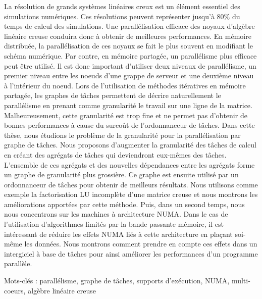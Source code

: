 La résolution de grands systèmes linéaires creux est un élément essentiel des simulations numériques. Ces résolutions peuvent représenter jusqu'à 80\% du temps de calcul des simulations.
Une parallélisation efficace des noyaux d'algèbre linéaire creuse conduira donc à obtenir de meilleures performances. En mémoire distribuée, la parallélisation de ces noyaux se fait le plus souvent en modifiant le schéma numérique. Par contre, en mémoire partagée, un parallélisme plus efficace peut être utilisé. Il est donc important d'utiliser deux niveaux de parallélisme, un premier niveau entre les noeuds d'une grappe de serveur et une deuxième niveau à l'intérieur du noeud. Lors de l'utilisation de méthodes itératives en mémoire partagée, les graphes de tâches permettent de décrire naturellement le parallélisme en prenant comme granularité le travail sur une ligne de la matrice. Malheureusement, cette granularité est trop fine et ne permet pas d'obtenir de bonnes performances à cause du surcoût de l'ordonnanceur de tâches.
Dans cette thèse, nous étudions le problème de la granularité pour la parallélisation par graphe de tâches. Nous proposons d'augmenter la granularité des tâches de calcul en créant des agrégats de tâches qui deviendront eux-mêmes des tâches. L'ensemble de ces agrégats et des nouvelles dépendances entre les agrégats forme un graphe de granularité plus grossière. Ce graphe est ensuite utilisé par un ordonnanceur de tâches pour obtenir de meilleurs résultats. Nous utilisons comme exemple la factorisation LU incomplète d'une matrice creuse et nous montrons les améliorations apportées par cette méthode. Puis, dans un second temps, nous nous concentrons sur les machines à architecture NUMA. Dans le cas de l'utilisation d'algorithmes limités par la bande passante mémoire, il est intéressant de réduire les effets NUMA liés à cette architecture en plaçant soi-même les données. Nous montrons comment prendre en compte ces effets dans un intergiciel à base de tâches pour ainsi améliorer les performances d'un programme parallèle.

Mots-clés : parallélisme, graphe de tâches, supports d'exécution, NUMA, multi-coeurs, algèbre linéaire creuse
